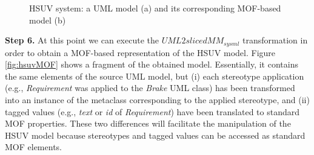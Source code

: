 \begin{figure}
  \caption{HSUV system: a UML model (a) and its corresponding MOF-based model (b)}
  \label{fig:hsuv}
\end{figure}
\vspace{-.4cm}

\textbf{Step 6.} At this point we can execute the $UML2slicedMM_{sysml}$ transformation in order to obtain a MOF-based representation
of the HSUV model. Figure \ref{fig:hsuvMOF} shows a fragment of the obtained model. 
Essentially, it contains the same elements of the source UML model, but (i) each stereotype application (e.g., \textit{Requirement}
was applied to the \textit{Brake} UML class)
has been transformed into an instance of the metaclass corresponding to the applied stereotype,
and (ii) tagged values (e.g., \textit{text} or \textit{id} of \textit{Requirement}) 
have been translated to standard MOF properties. These two differences will facilitate
the manipulation of the HSUV model because stereotypes and tagged values can be accessed as standard MOF elements.

